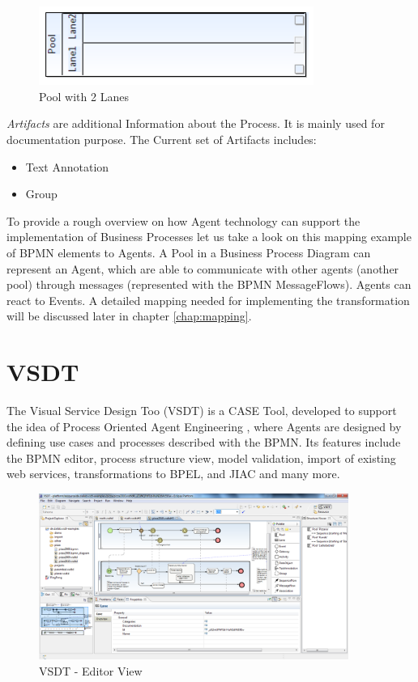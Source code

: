 \begin{figure}[htbp]
	\centering
		\includegraphics[width = 0.8\textwidth]{images/swimlane.png}
	\caption{Pool with 2 Lanes}
	\label{fig:swimlane}
\end{figure}

\textit{Artifacts} are additional Information about the Process. It is mainly used for documentation purpose. The Current set of Artifacts includes:
\begin{itemize}
	\item Text Annotation
	\item Group
\end{itemize}


To provide a rough overview on how Agent technology can support the implementation of Business Processes let us take a look on this mapping example of BPMN elements to Agents. A Pool in a Business Process Diagram can represent an Agent, which are able to communicate with other agents (another pool) through messages (represented with the BPMN MessageFlows). Agents can react to Events. A detailed mapping needed for implementing the transformation will be discussed later in chapter \ref{chap:mapping}.
\section{VSDT}
\label{sec:vsdt}
The Visual Service Design Too (VSDT) \cite{VSDTWEB} is a CASE Tool, developed to support the idea of Process Oriented Agent Engineering \cite{TKMLAH2010}, where Agents are designed by defining use cases and processes described with the BPMN. Its features include the BPMN editor, process structure view, model validation, import of existing web services, transformations to BPEL, and JIAC and many more. 
\begin{figure}[h]
	\centering
		\includegraphics[width=0.90\textwidth]{images/vsdt_snapshot.png}
	\caption{VSDT - Editor View}
	\label{fig:VSDT}
\end{figure}

